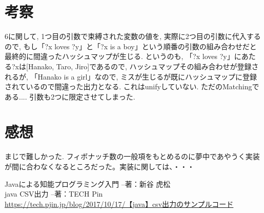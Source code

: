 \documentclass[uplatex,12pt]{jsarticle}
\begin{document}
\section{考察}
6に関して, 1つ目の引数で束縛された変数の値を, 実際に2つ目の引数に代入するので, もし「?x loves ?y」と「?x is a boy」という順番の引数の組み合わせだと最終的に間違ったハッシュマップが生じる. というのも, 「?x loves ?y」にあたる?xは[Hanako, Taro, Jiro]であるので, ハッシュマップその組み合わせが登録されるが, 「Hanako is a girl」なので, ミスが生じるが既にハッシュマップに登録されているので間違った出力となる.
これはunifyしていない. ただのMatchingである....
引数も2つに限定させてしまった.


\section{感想}
まじで難しかった.
フィボナッチ数の一般項をもとめるのに夢中であやうく実装が間に合わなくなるところだった。実装に関しては、・・・

\begin{thebibliography}{99}
 Javaによる知能プログラミング入門 --著：新谷 虎松 \\
 java CSV出力 --著：TECH Pin \\
\url{https://tech.pjin.jp/blog/2017/10/17/【java】csv出力のサンプルコード}
\end{thebibliography}
\end{document}
